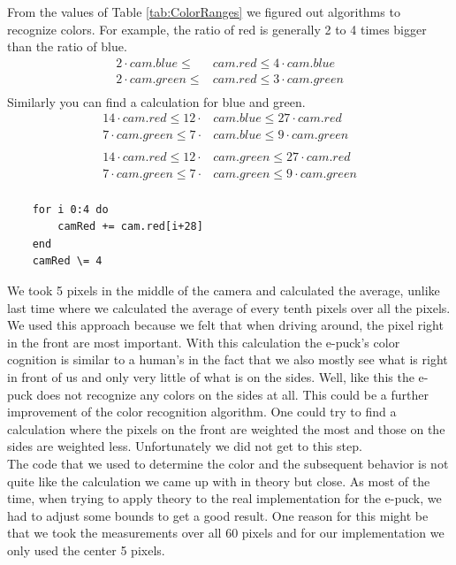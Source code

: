 \documentclass[a4paper]{article}
\begin{document}
			\noindent From the values of Table \ref{tab:ColorRanges} we figured out algorithms 
			to recognize colors. For example, the ratio of red is generally 2 to 4 times bigger 
			than the ratio of blue.	
			\begin{align*}
				2 \cdot cam.blue \leq &cam.red \leq 4 \cdot cam.blue \\
				2 \cdot cam.green \leq &cam.red \leq 3 \cdot cam.green\\
			\end{align*}
			Similarly you can find a calculation for blue and green.
			\begin{align*}
				14 \cdot cam.red \leq 12 \cdot &cam.blue \leq 27 \cdot cam.red \\
				7 \cdot cam.green \leq 7 \cdot &cam.blue \leq 9 \cdot cam.green\\
				\\
				14 \cdot cam.red \leq 12 \cdot &cam.green \leq 27 \cdot cam.red \\
				7 \cdot cam.green \leq 7 \cdot &cam.green \leq 9 \cdot cam.green\\
			\end{align*}	
			\newpage
			
			\begin{lstlisting}
	for i 0:4 do
		camRed += cam.red[i+28]
	end
	camRed \= 4
			\end{lstlisting}	
				
			\noindent We took 5 pixels in the middle of the camera and calculated the average, 
			unlike last time where we calculated the average of every tenth pixels over all the 
			pixels. We used this approach because we felt that when driving around, the pixel 
			right in the front are most important. With this calculation the e-puck's color 
			cognition is similar to a human's in the fact that we also mostly see what is right 
			in front of us and only very little of what is on the sides. Well, like this the e-
			puck does not recognize any colors on the sides at all. This could be a further 
			improvement of the color recognition algorithm. One could try to find a calculation 
			where the pixels on the front are weighted the most and those on the sides are 
			weighted less. Unfortunately we did not get to this step.\\
			
			\noindent The code that we used to determine the color and the subsequent behavior is 
			not quite like the calculation we came up with in theory but close. As most of the 
			time, when trying to apply theory to the real implementation for the e-puck, we had to 
			adjust some bounds to get a good result. One reason for this might be that we took the 
			measurements over all 60 pixels and for our implementation we only used the center 5 
			pixels.
			
\end{document}
